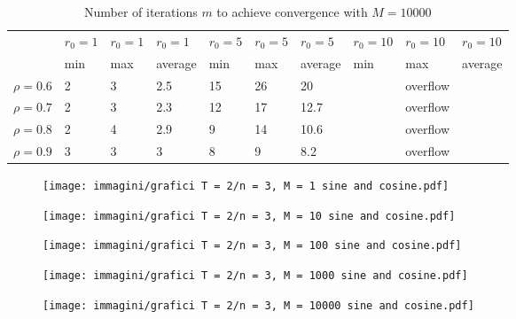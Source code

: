 \documentclass[a4paper,11pt,openright]{report}
\begin{document}
\begin{table}[H]
\centering
\addtolength{\leftskip}{-1.5cm}
\addtolength{\rightskip}{-1.5cm}
\begin{tabular}{|c|lllllllll|}
\hline
$ $ & $r_0 = 1$ & $r_0 = 1$ & $r_0 = 1$ & $r_0 = 5$ & $r_0 = 5$ & $r_0 = 5$ & $r_0 = 10$ & $r_0 = 10$ & $r_0 = 10$  \\
$ $ & min & max & average & min & max & average & min & max & average \\ 
\hline
$\rho = 0.6$ & 2 & 3 & 2.5 & 15 & 26 & 20 &  & overflow &  \\

$\rho = 0.7$ & 2 & 3 & 2.3 & 12 & 17 & 12.7 &  & overflow &  \\

$\rho = 0.8$ & 2 & 4 & 2.9 & 9 & 14 & 10.6 &  & overflow & \\

$\rho = 0.9$ & 3 & 3 & 3 & 8 & 9 & 8.2 &  & overflow & \\
\hline
\end{tabular}
\caption{Number of iterations $m$ to achieve convergence with $M = 10000$}
\end{table}
\begin{figure}[H]
\centering
\texttt{[image: immagini/grafici T = 2/n = 3, M = 1 sine and cosine.pdf]}
\end{figure}
\begin{figure}[H]
\centering
\texttt{[image: immagini/grafici T = 2/n = 3, M = 10 sine and cosine.pdf]}
\end{figure}
\begin{figure}[H]
\centering
\texttt{[image: immagini/grafici T = 2/n = 3, M = 100 sine and cosine.pdf]}
\end{figure}
\begin{figure}[H]
\centering
\texttt{[image: immagini/grafici T = 2/n = 3, M = 1000 sine and cosine.pdf]}
\end{figure}
\begin{figure}[H]
\centering
\texttt{[image: immagini/grafici T = 2/n = 3, M = 10000 sine and cosine.pdf]}
\end{figure}
\newpage
\end{document}
